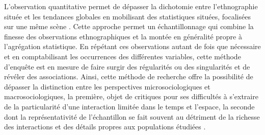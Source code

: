 \begin{refsegment}
L'observation quantitative permet de dépasser la dichotomie entre l'ethnographie située et les tendances globales en mobilisant des statistiques situées, focalisées sur une même scène \textcolor{blue}{\autocite[102]{cochoy_mort_2013}}. Cette approche permet un échantillonnage qui combine la finesse des observations ethnographiques et la montée en généralité propre à l’agrégation statistique. En répétant ces observations autant de fois que nécessaire et en comptabilisant les occurrences des différentes variables, cette méthode d'enquête est en mesure de faire surgir des régularités ou des singularités et de révéler des associations. Ainsi, cette méthode de recherche offre la possibilité de dépasser la distinction entre les perspectives microsociologiques et macrosociologiques, la première, objet de critiques pour ses difficultés à s'extraire de la particularité d'une interaction limitée dans le temps et l'espace, la seconde dont la représentativité de l'échantillon se fait souvent au détriment de la richesse des interactions et des détails propres aux populations étudiées \textcolor{blue}{\autocite[102]{cochoy_mort_2013}}.%


\end{refsegment}
